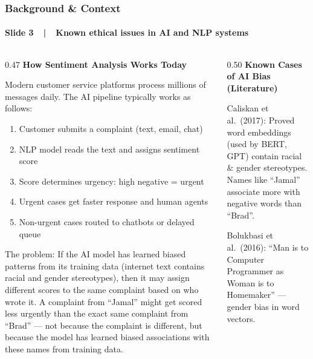 \documentclass[aspectratio=43,11pt]{beamer}
\begin{document}
\begin{frame}[t]
\frametitle{Background \& Context}
\framesubtitle{Slide 3~~|~~Known ethical issues in AI and NLP systems}

\vspace{-2pt}
\begin{columns}[T]
\begin{column}{0.47\textwidth}
{\small\bfseries\color{DarkBlue} How Sentiment Analysis Works Today}\\[3pt]
{\scriptsize
Modern customer service platforms process millions of
messages daily. The AI pipeline typically works as follows:

\begin{enumerate}
  \item Customer submits a complaint (text, email, chat)
  \item NLP model reads the text and assigns sentiment score
  \item Score determines urgency: high negative = urgent
  \item Urgent cases get faster response and human agents
  \item Non-urgent cases routed to chatbots or delayed queue
\end{enumerate}

The problem: If the AI model has learned biased patterns
from its training data (internet text contains racial and
gender stereotypes), then it may assign different scores
to the same complaint based on who wrote it. A complaint
from ``Jamal'' might get scored less urgently than the
exact same complaint from ``Brad'' --- not because the
complaint is different, but because the model has learned
biased associations with these names from training data.
}
\end{column}
\begin{column}{0.50\textwidth}
{\small\bfseries\color{RedAccent} Known Cases of AI Bias (Literature)}\\[3pt]
{\scriptsize
Caliskan et al.\ (2017): Proved word embeddings (used by
BERT, GPT) contain racial \& gender stereotypes. Names like
``Jamal'' associate more with negative words than ``Brad''.

\vspace{3pt}
Bolukbasi et al.\ (2016): ``Man is to Computer Programmer
as Woman is to Homemaker'' --- gender bias in word vectors.

}
\end{column}
\end{columns}
\end{frame}
\end{document}
